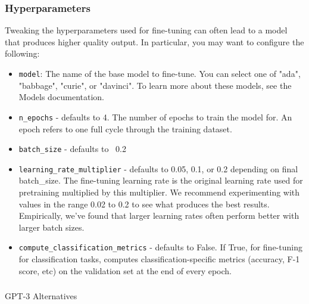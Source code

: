 \begin{frame}[fragile]\frametitle{Hyperparameters}

Tweaking the hyperparameters used for fine-tuning can often lead to a model that produces higher quality output. In particular, you may want to configure the following:

\begin{itemize}
\item \lstinline|model|: The name of the base model to fine-tune. You can select one of "ada", "babbage", "curie", or "davinci". To learn more about these models, see the Models documentation.
\item \lstinline|n_epochs| - defaults to 4. The number of epochs to train the model for. An epoch refers to one full cycle through the training dataset.
\item \lstinline|batch_size| - defaults to ~0.2%
\item \lstinline|learning_rate_multiplier| - defaults to 0.05, 0.1, or 0.2 depending on final batch\_size. The fine-tuning learning rate is the original learning rate used for pretraining multiplied by this multiplier. We recommend experimenting with values in the range 0.02 to 0.2 to see what produces the best results. Empirically, we've found that larger learning rates often perform better with larger batch sizes.
\item \lstinline|compute_classification_metrics| - defaults to False. If True, for fine-tuning for classification tasks, computes classification-specific metrics (accuracy, F-1 score, etc) on the validation set at the end of every epoch.
\end{itemize}


\end{frame}





\begin{frame}[fragile]\frametitle{}
\begin{center}
{\Large GPT-3 Alternatives}
\end{center}
\end{frame}

